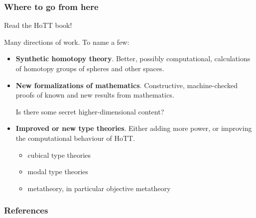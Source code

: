 \documentclass[handout]{beamer} %
\begin{document}
\begin{frame}
  \frametitle{Where to go from here}
  
  Read the HoTT book!

  \medskip

  Many directions of work. To name a few:
  \begin{itemize}
    \item \textbf{Synthetic homotopy theory}. Better, possibly computational,
      calculations of homotopy groups of spheres and other spaces.
    \item \textbf{New formalizations of mathematics}. Constructive,
      machine-checked proofs of known and new results from mathematics.
      
      Is there some secret higher-dimensional content?
    \item \textbf{Improved or new type theories}. Either adding more power, or
      improving the computational behaviour of HoTT.
      \begin{itemize}
        \item cubical type theories
        \item modal type theories
        \item metatheory, in particular objective metatheory
      \end{itemize}
  \end{itemize}
\end{frame}



\begin{frame}
  \frametitle{References}
  
  
  \nocite{hott_2013}
  \nocite{awodey_2017}
  \nocite{hofmann_1997-ext}
  \nocite{pelayo_2014}
\end{frame}
\end{document}
